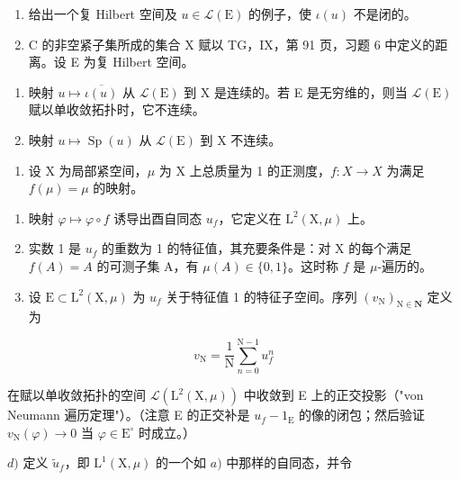 \begin{enumerate}
\def\labelenumi{\arabic{enumi})}
\setcounter{enumi}{13}
\item
  给出一个复 Hilbert 空间及 \(u \in \mathcal{L}(\mathrm{E})\) 的例子，使 \(\iota(u)\) 不是闭的。
\item
  C 的非空紧子集所成的集合 X 赋以 TG，IX，第 91 页，习题 6 中定义的距离。设 E 为复 Hilbert 空间。
\end{enumerate}

\begin{enumerate}
\def\labelenumi{\alph{enumi})}
\item
  映射 \(u \mapsto \overline{\iota(u)}\) 从 \(\mathcal{L}(\mathrm{E})\) 到 X 是连续的。若 E 是无穷维的，则当 \(\mathcal{L}(\mathrm{E})\) 赋以单收敛拓扑时，它不连续。
\item
  映射 \(u \mapsto \operatorname{Sp}(u)\) 从 \(\mathcal{L}(\mathrm{E})\) 到 X 不连续。
\end{enumerate}

\begin{enumerate}
\def\labelenumi{\arabic{enumi})}
\setcounter{enumi}{15}
\tightlist
\item
  设 X 为局部紧空间，\(\mu\) 为 X 上总质量为 1 的正测度，\(f: X \to X\) 为满足 \(f(\mu) = \mu\) 的映射。
\end{enumerate}

\begin{enumerate}
\def\labelenumi{\alph{enumi})}
\item
  映射 \(\varphi \mapsto \varphi \circ f\) 诱导出酉自同态 \(u_{f}\)，它定义在 \(\mathrm{L}^2 (\mathrm{X},\mu)\) 上。
\item
  实数 1 是 \(u_f\) 的重数为 1 的特征值，其充要条件是：对 X 的每个满足 \(f(A) = A\) 的可测子集 A，有 \(\mu(A) \in \{0,1\}\)。这时称 \(f\) 是 \(\mu\)-遍历的。
\item
  设 \(\mathrm{E}\subset\mathrm{L}^{2}(\mathrm{X},\mu)\) 为 \(u_{f}\) 关于特征值 1 的特征子空间。序列 \((v_{\mathrm{N}})_{\mathrm{N}\in\mathbf{N}}\) 定义为
\end{enumerate}

\[
v _ {\mathrm{N}} = \frac {1}{\mathrm{N}} \sum_ {n = 0} ^ {\mathrm{N-1}} u _ {f} ^ {n}
\]

在赋以单收敛拓扑的空间 \(\mathcal{L}(\mathrm{L}^{2}(\mathrm{X},\mu))\) 中收敛到 E 上的正交投影（"von Neumann 遍历定理"）。（注意 E 的正交补是 \(u_{f}-1_{\mathrm{E}}\) 的像的闭包；然后验证 \(v_{\mathrm{N}}(\varphi)\to0\) 当 \(\varphi\in\mathrm{E}^{\circ}\) 时成立。）

\(d)\) 定义 \(\widetilde{u}_f\)，即 \(\mathrm{L}^1 (\mathrm{X},\mu)\) 的一个如 \(a)\) 中那样的自同态，并令

